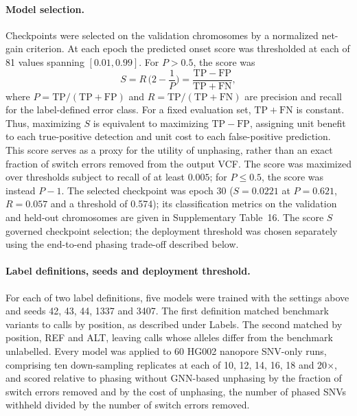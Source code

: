 \documentclass[11pt,a4paper]{article}
\begin{document}
\paragraph{Model selection.} Checkpoints were selected on the validation chromosomes by a normalized net-gain criterion. At each epoch the predicted onset score was thresholded at each of 81 values spanning $[0.01, 0.99]$. For $P>0.5$, the score was
\begin{equation}
S = R\,\Big(2 - \frac{1}{P}\Big) = \frac{\mathrm{TP}-\mathrm{FP}}{\mathrm{TP}+\mathrm{FN}},
\end{equation}
where $P=\mathrm{TP}/(\mathrm{TP}+\mathrm{FP})$ and $R=\mathrm{TP}/(\mathrm{TP}+\mathrm{FN})$ are precision and recall for the label-defined error class. For a fixed evaluation set, $\mathrm{TP}+\mathrm{FN}$ is constant. Thus, maximizing $S$ is equivalent to maximizing $\mathrm{TP}-\mathrm{FP}$, assigning unit benefit to each true-positive detection and unit cost to each false-positive prediction. This score serves as a proxy for the utility of unphasing, rather than an exact fraction of switch errors removed from the output VCF. The score was maximized over thresholds subject to recall of at least $0.005$; for $P\le0.5$, the score was instead $P-1$. The selected checkpoint was epoch 30 ($S = 0.0221$ at $P = 0.621$, $R = 0.057$ and a threshold of 0.574); its classification metrics on the validation and held-out chromosomes are given in Supplementary Table~16. The score $S$ governed checkpoint selection; the deployment threshold was chosen separately using the end-to-end phasing trade-off described below.

\paragraph{Label definitions, seeds and deployment threshold.} For each of two label definitions, five models were trained with the settings above and seeds 42, 43, 44, 1337 and 3407. The first definition matched benchmark variants to calls by position, as described under Labels. The second matched by position, REF and ALT, leaving calls whose alleles differ from the benchmark unlabelled. Every model was applied to 60 HG002 nanopore SNV-only runs, comprising ten down-sampling replicates at each of 10, 12, 14, 16, 18 and 20$\times$, and scored relative to phasing without GNN-based unphasing by the fraction of switch errors removed and by the cost of unphasing, the number of phased SNVs withheld divided by the number of switch errors removed.
\end{document}
